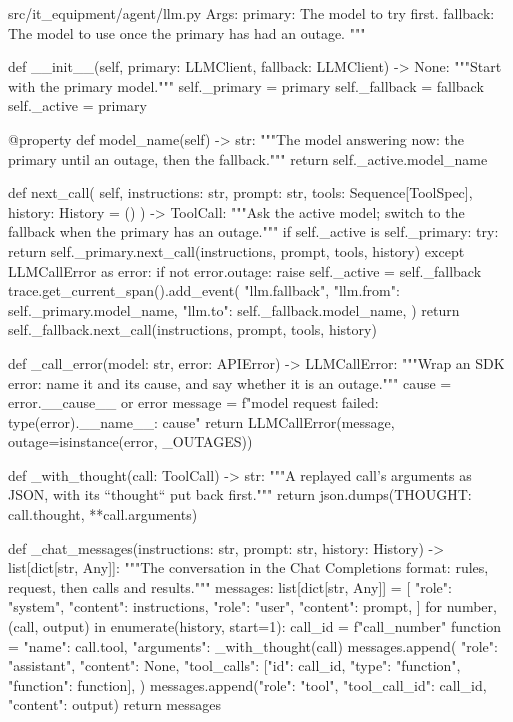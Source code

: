 \documentclass[11pt,letterpaper]{article}
\renewcommand{\_}{\textunderscore\allowbreak}
\begin{document}
\begin{codebox}{src/it_equipment/agent/llm.py}
    Args:
        primary: The model to try first.
        fallback: The model to use once the primary has had an outage.
    """

    def __init__(self, primary: LLMClient, fallback: LLMClient) -> None:
        """Start with the primary model."""
        self._primary = primary
        self._fallback = fallback
        self._active = primary

    @property
    def model_name(self) -> str:
        """The model answering now: the primary until an outage, then the fallback."""
        return self._active.model_name

    def next_call(
        self, instructions: str, prompt: str, tools: Sequence[ToolSpec], history: History = ()
    ) -> ToolCall:
        """Ask the active model; switch to the fallback when the primary has an outage."""
        if self._active is self._primary:
            try:
                return self._primary.next_call(instructions, prompt, tools, history)
            except LLMCallError as error:
                if not error.outage:
                    raise
                self._active = self._fallback
                trace.get_current_span().add_event(
                    "llm.fallback",
                    {"llm.from": self._primary.model_name, "llm.to": self._fallback.model_name},
                )
        return self._fallback.next_call(instructions, prompt, tools, history)


def _call_error(model: str, error: APIError) -> LLMCallError:
    """Wrap an SDK error: name it and its cause, and say whether it is an outage."""
    cause = error.__cause__ or error
    message = f"{model} request failed: {type(error).__name__}: {cause}"
    return LLMCallError(message, outage=isinstance(error, _OUTAGES))


def _with_thought(call: ToolCall) -> str:
    """A replayed call's arguments as JSON, with its ``thought`` put back first."""
    return json.dumps({THOUGHT: call.thought, **call.arguments})


def _chat_messages(instructions: str, prompt: str, history: History) -> list[dict[str, Any]]:
    """The conversation in the Chat Completions format: rules, request, then calls and results."""
    messages: list[dict[str, Any]] = [
        {"role": "system", "content": instructions},
        {"role": "user", "content": prompt},
    ]
    for number, (call, output) in enumerate(history, start=1):
        call_id = f"call_{number}"
        function = {"name": call.tool, "arguments": _with_thought(call)}
        messages.append(
            {
                "role": "assistant",
                "content": None,
                "tool_calls": [{"id": call_id, "type": "function", "function": function}],
            }
        )
        messages.append({"role": "tool", "tool_call_id": call_id, "content": output})
    return messages



\end{codebox}
\end{document}
